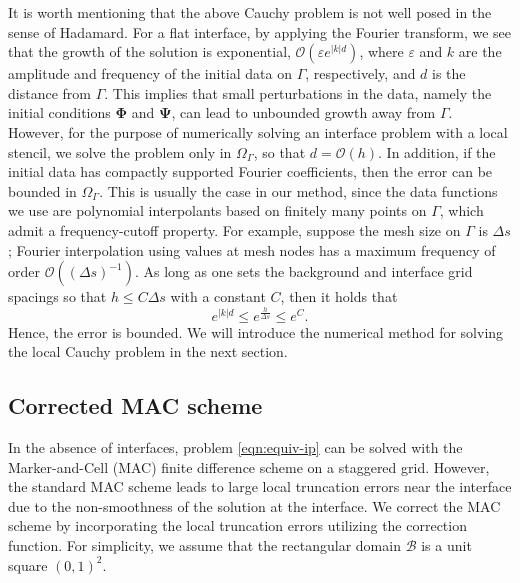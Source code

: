 \documentclass[preprint,11pt]{elsarticle}
\theoremstyle{remark}
\newcommand{\mc}[1]{\mathcal{#1}}
\newcommand{\bm}[1]{\boldsymbol{#1}}
\begin{document}
It is worth mentioning that the above Cauchy problem is not well posed in the sense of Hadamard. For a flat interface, by applying the Fourier transform, we see that the growth of the solution is exponential, $\mathcal{O}(\varepsilon e^{|k|d})$, where $\varepsilon$ and $k$ are the amplitude and frequency of the initial data on $\Gamma$, respectively, and $d$ is the distance from $\Gamma$. This implies that small perturbations in the data, namely the initial conditions $\bm \Phi$ and $\bm \Psi$, can lead to unbounded growth away from $\Gamma$. However, for the purpose of numerically solving an interface problem with a local stencil, we solve the problem only in $\Omega_\Gamma$, so that $d = \mc O (h)$. In addition, if the initial data has compactly supported Fourier coefficients, then the error can be bounded in $\Omega_\Gamma$. This is usually the case in our method, since the data functions we use are polynomial interpolants based on finitely many points on $\Gamma$, which admit a frequency-cutoff property. For example, suppose the mesh size on $\Gamma$ is $\Delta s$; Fourier interpolation using values at mesh nodes has a maximum frequency of order $\mc O((\Delta s)^{-1})$. As long as one sets the background and interface grid spacings so that $h \le C \Delta s$ with a constant $C$, then it holds that
\begin{equation}
    e^{|k|d} \leq  e^{\frac{h}{\Delta s}} \leq e^C.
\end{equation}
Hence, the error is bounded.
We will introduce the numerical method for solving the local Cauchy problem in the next section.

\subsection{Corrected MAC scheme}
In the absence of interfaces, problem \eqref{eqn:equiv-ip} can be solved with the Marker-and-Cell (MAC) finite difference scheme on a staggered grid.
However, the standard MAC scheme leads to large local truncation errors near the interface due to the non-smoothness of the solution at the interface.
We correct the MAC scheme by incorporating the local truncation errors utilizing the correction function.
For simplicity, we assume that the rectangular domain $\mathcal{B}$ is a unit square $(0,1)^2$.
\end{document}
